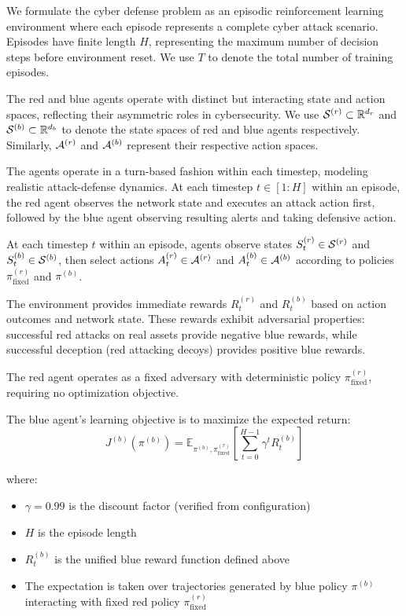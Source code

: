 \documentclass[12pt,oneside,a4paper]{article}
\theoremstyle{definition}
\theoremstyle{plain}
\begin{document}
We formulate the cyber defense problem as an episodic reinforcement learning environment where each episode represents a complete cyber attack scenario. Episodes have finite length $H$, representing the maximum number of decision steps before environment reset. We use $T$ to denote the total number of training episodes.

The red and blue agents operate with distinct but interacting state and action spaces, reflecting their asymmetric roles in cybersecurity. We use $\mathcal{S}^{(r)} \subset \mathbb{R}^{d_r}$ and $\mathcal{S}^{(b)} \subset \mathbb{R}^{d_b}$ to denote the state spaces of red and blue agents respectively. Similarly, $\mathcal{A}^{(r)}$ and $\mathcal{A}^{(b)}$ represent their respective action spaces.

The agents operate in a turn-based fashion within each timestep, modeling realistic attack-defense dynamics. At each timestep $t \in [1:H]$ within an episode, the red agent observes the network state and executes an attack action first, followed by the blue agent observing resulting alerts and taking defensive action.

At each timestep $t$ within an episode, agents observe states $S_t^{(r)} \in \mathcal{S}^{(r)}$ and $S_t^{(b)} \in \mathcal{S}^{(b)}$, then select actions $A_t^{(r)} \in \mathcal{A}^{(r)}$ and $A_t^{(b)} \in \mathcal{A}^{(b)}$ according to policies $\pi^{(r)}_{\text{fixed}}$ and $\pi^{(b)}$.

The environment provides immediate rewards $R_t^{(r)}$ and $R_t^{(b)}$ based on action outcomes and network state. These rewards exhibit adversarial properties: successful red attacks on real assets provide negative blue rewards, while successful deception (red attacking decoys) provides positive blue rewards.

The red agent operates as a fixed adversary with deterministic policy $\pi^{(r)}_{\text{fixed}}$, requiring no optimization objective.

The blue agent's learning objective is to maximize the expected return:
\begin{equation}
J^{(b)}(\pi^{(b)}) = \mathbb{E}_{\pi^{(b)}, \pi^{(r)}_{\text{fixed}}}\left[\sum_{t=0}^{H-1} \gamma^t R_t^{(b)}\right]
\end{equation}

where:
\begin{itemize}
\item $\gamma = 0.99$ is the discount factor (verified from configuration)
\item $H$ is the episode length 
\item $R_t^{(b)}$ is the unified blue reward function defined above
\item The expectation is taken over trajectories generated by blue policy $\pi^{(b)}$ interacting with fixed red policy $\pi^{(r)}_{\text{fixed}}$
\end{itemize}
\end{document}
